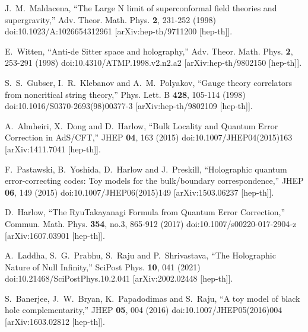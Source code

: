 \documentclass[a4paper,12pt]{article}
\begin{document}
\begin{thebibliography}{}

J.~M.~Maldacena,
``The Large N limit of superconformal field theories and supergravity,''
Adv. Theor. Math. Phys. \textbf{2}, 231-252 (1998)
doi:10.1023/A:1026654312961
[arXiv:hep-th/9711200 [hep-th]].

E.~Witten,
``Anti-de Sitter space and holography,''
Adv. Theor. Math. Phys. \textbf{2}, 253-291 (1998)
doi:10.4310/ATMP.1998.v2.n2.a2
[arXiv:hep-th/9802150 [hep-th]].

S.~S.~Gubser, I.~R.~Klebanov and A.~M.~Polyakov,
``Gauge theory correlators from noncritical string theory,''
Phys. Lett. B \textbf{428}, 105-114 (1998)
doi:10.1016/S0370-2693(98)00377-3
[arXiv:hep-th/9802109 [hep-th]].

A.~Almheiri, X.~Dong and D.~Harlow,
``Bulk Locality and Quantum Error Correction in AdS/CFT,''
JHEP \textbf{04}, 163 (2015)
doi:10.1007/JHEP04(2015)163
[arXiv:1411.7041 [hep-th]].

F.~Pastawski, B.~Yoshida, D.~Harlow and J.~Preskill,
``Holographic quantum error-correcting codes: Toy models for the bulk/boundary correspondence,''
JHEP \textbf{06}, 149 (2015)
doi:10.1007/JHEP06(2015)149
[arXiv:1503.06237 [hep-th]].

D.~Harlow,
``The Ryu\textendash{}Takayanagi Formula from Quantum Error Correction,''
Commun. Math. Phys. \textbf{354}, no.3, 865-912 (2017)
doi:10.1007/s00220-017-2904-z
[arXiv:1607.03901 [hep-th]].

A.~Laddha, S.~G.~Prabhu, S.~Raju and P.~Shrivastava,
``The Holographic Nature of Null Infinity,''
SciPost Phys. \textbf{10}, 041 (2021)
doi:10.21468/SciPostPhys.10.2.041
[arXiv:2002.02448 [hep-th]].

S.~Banerjee, J.~W.~Bryan, K.~Papadodimas and S.~Raju,
``A toy model of black hole complementarity,''
JHEP \textbf{05}, 004 (2016)
doi:10.1007/JHEP05(2016)004
[arXiv:1603.02812 [hep-th]].


\end{thebibliography}
\end{document}
